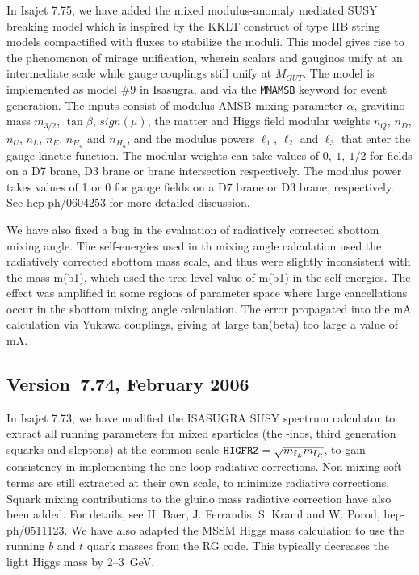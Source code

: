 In Isajet 7.75, we have added the mixed modulus-anomaly mediated
SUSY breaking model which is inspired by the KKLT construct of
type IIB string models compactified with fluxes to stabilize the moduli.
This model gives rise to the phenomenon of mirage unification, wherein
scalars and gauginos unify at an intermediate scale while gauge couplings still
unify at $M_{GUT}$. The model is implemented as model $\#9$ in Isasugra,
and via the \verb|MMAMSB| keyword for event generation. The inputs consist
of modulus-AMSB mixing parameter $\alpha$, gravitino mass $m_{3/2}$,
$\tan\beta$, $sign(\mu )$, the matter and Higgs field modular weights
$n_Q$, $n_D$, $n_U$, $n_L$, $n_E$, $n_{H_d}$ and $n_{H_u}$, and the
modulus powers $\ell_1$, $\ell_2$ and $\ell_3$ that enter the 
gauge kinetic function. The modular weights can take values of
$0,\ 1,\ {1/2}$ for fields on a D7 brane, D3 brane or brane intersection
respectively. The modulus power takes values of 1 or 0 for gauge fields
on a D7 brane or D3 brane, respectively. See hep-ph/0604253 for more
detailed discussion.

We have also fixed a bug in the evaluation of radiatively corrected 
sbottom mixing angle. The self-energies used in th mixing angle calculation
used the radiatively corrected sbottom mass scale, and thus were slightly
inconsistent with the mass m(b1), which used the tree-level value of
m(b1) in the self energies. The effect was amplified in some 
regions of parameter space where large cancellations occur in the 
sbottom mixing angle calculation. The error propagated into the mA calculation 
via Yukawa couplings, giving at large tan(beta) too large a value of mA.

\subsection{Version~7.74, February 2006}

In Isajet 7.73, we have modified the ISASUGRA SUSY spectrum calculator
to extract all running parameters for mixed sparticles (the -inos, third
generation squarks and sleptons) at the common scale ${\tt
HIGFRZ}=\sqrt{m_{\tilde t_L} m_{\tilde t_R}}$, to gain consistency in
implementing the one-loop radiative corrections. Non-mixing soft terms
are still extracted at their own scale, to minimize radiative
corrections.  Squark mixing contributions to the gluino mass radiative
correction have also been added. For details, see H. Baer, J. Ferrandis,
S. Kraml and W. Porod, hep-ph/0511123.
We have also adapted the MSSM Higgs mass calculation to use the
running $b$ and $t$ quark masses from the RG code. This typically
decreases the light Higgs mass by 2--3~GeV.

